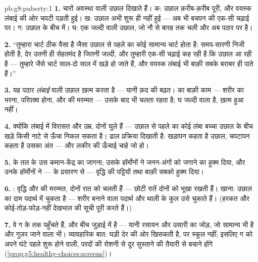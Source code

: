 \begin{solution}{pb:g8:puberty:1}
\textbf{1.} चारों  अवस्था वाली उछाल दिखाते हैं। क: उछाल
क़रीब-क़रीब पूरी, और वयस्क लंबाई की ओर चपटी पड़ती हुई। ख: उछाल अभी शुरू
ही नहीं हुई --- अब भी बचपन की एक-सी चढ़ाई पर। ग: उछाल के बीच में। घ: एक
जल्दी वाली उछाल, जो नौ से बारह तक चली और अब पठार पर है।

\textbf{2.} ``तुम्हारा चार्ट ठीक वैसा है जैसा उछाल से पहले का कोई
सामान्य चार्ट होता है: समय-सारणी निजी होती है, देर उतनी ही सेहतमंद है
जितनी जल्दी, और तुम्हारी एक-सी चढ़ाई कह रही है कि उछाल आ रही है ---
तुम्हारे जैसे चार्ट साल-दो साल में खड़े हो जाते हैं, और वयस्क लंबाई भी
बाक़ी सबके बराबर ही पाते हैं।''

\textbf{3.} यह पठार \emph{लंबाई} वाली उछाल ख़त्म करता है --- यानी क़द
की बढ़त।  का बाक़ी काम --- शरीर का भरना, परिपक्व होना, और
 की मरम्मत --- उसके बाद भी चलता रहता है; घ जल्दी वाला है, ख़त्म
हुआ नहीं।

\textbf{4.} क्योंकि लंबाई में विरासत और उम्र, दोनों घुले हैं --- उछाल से
पहले का कोई लंबा बच्चा उछाल के बीच खड़े किसी नाटे से ऊँचा निकल सकता है।
ढाल प्रक्रिया दिखाती है: खड़ापन कहता है उछाल, चपटापन कहता है उसका अंत ---
और लकीर की ऊँचाई चाहे जो हो।

\textbf{5.}  के तल के उस कमान-केंद्र का जागना; उसके हॉर्मोनों ने
जनन-अंगों को जगाने का हुक्म दिया, और उनके हॉर्मोनों ने ---  के
प्रसारण से --- वृद्धि की पट्टियों तथा बाक़ी सबको हुक्म दिया।

\textbf{6.} : वृद्धि और  की मरम्मत, दोनों रात को चलती हैं
--- छोटी रातें दोनों को भूखा रखती हैं। खाना: उछाल का दाम पदार्थ में
चुकता है --- शरीर बनाने वाला पदार्थ और थाली के कुल उसे चुकाते हैं।
(हरकत और कोई-तोड़-फोड़-नहीं देखभाल की सूची पूरी करते हैं।)

\textbf{7.} वे  ग के  तक पहुँचते हैं, और  बीच
जुड़ाई में है --- यानी रसायन और उसारी का जोड़, जो सामान्य भी है और
गुज़र जाने वाला भी। व्यावहारिक बात: घड़ी देर की ओर खिसकती है, पर स्कूल
नहीं; इसलिए ग को अपने घंटे पहले शुरू होने वाली, परदों की रोशनी से दूर
सुस्ताने की तैयारी से बचाने होंगे
(\cref{prop:g5:healthy-choices:screens})।


\end{solution}
